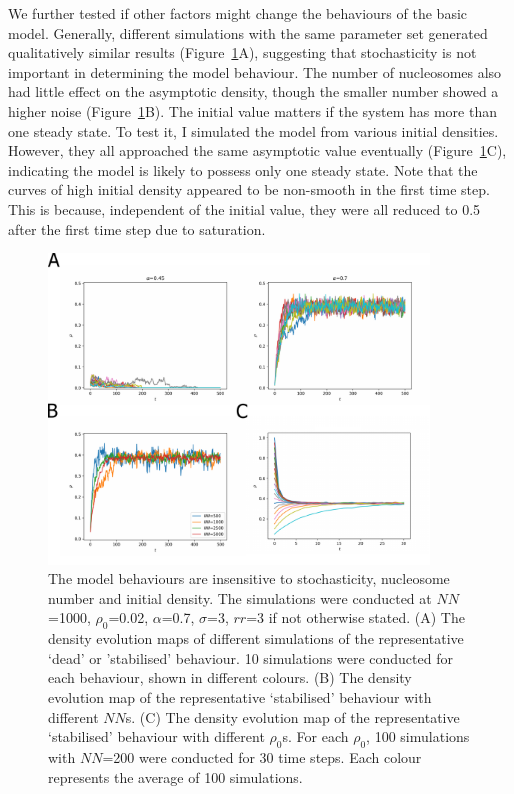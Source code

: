 We further tested if other factors might change the behaviours of the basic model. Generally, different simulations with the same parameter set generated qualitatively similar results (Figure~\ref{fig:parameterTest}A), suggesting that stochasticity is not important in determining the model behaviour. The number of nucleosomes also had little effect on the asymptotic density, though the smaller number showed a higher noise (Figure~\ref{fig:parameterTest}B). The initial value matters if the system has more than one steady state. To test it, I simulated the model from various initial densities. However, they all approached the same asymptotic value eventually (Figure~\ref{fig:parameterTest}C), indicating the model is likely to possess only one steady state. Note that the curves of high initial density appeared to be non-smooth in the first time step. This is because, independent of the initial value, they were all reduced to 0.5 after the first time step due to saturation. 

\begin{figure}[htbp]
  \centering
  \includegraphics[width=0.9\textwidth]{chapter2/figures/parameter_test.pdf}
  \caption[The model behaviours are insensitive to stochasticity, nucleosome number and initial density]{The model behaviours are insensitive to stochasticity, nucleosome number and initial density. The simulations were conducted at $NN$=1000, $\rho_{0}$=0.02, $\alpha$=0.7, $\sigma$=3, $rr$=3 if not otherwise stated. (A) The density evolution maps of different simulations of the representative ‘dead’ or 'stabilised' behaviour. 10 simulations were conducted for each behaviour, shown in different colours. (B) The density evolution map of the representative ‘stabilised' behaviour with different $NN$s. (C) The density evolution map of the representative ‘stabilised' behaviour with different $\rho_{0}$s. For each $\rho_{0}$, 100 simulations with $NN$=200 were conducted for 30 time steps. Each colour represents the average of 100 simulations. }
  \label{fig:parameterTest}
\end{figure}

